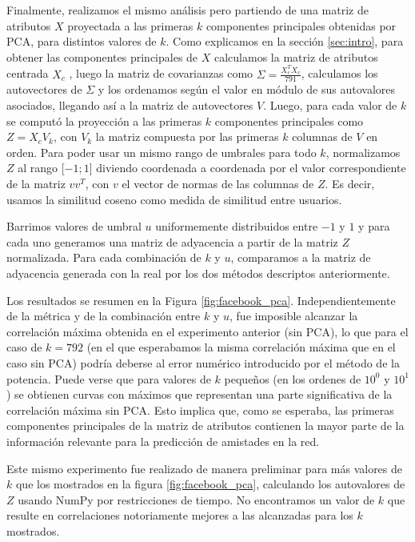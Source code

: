 \documentclass{article}
\begin{document}
Finalmente, realizamos el mismo análisis pero partiendo de una matriz de atributos $X$ proyectada a las primeras $k$ componentes principales obtenidas por PCA, para distintos valores de $k$. Como explicamos en la sección \ref{sec:intro}, para obtener las componentes principales de $X$ calculamos la matriz de atributos centrada $X_c$ 
, luego la matriz de covarianzas como $\Sigma = \frac{X_c^TX_c}{791}$, calculamos los autovectores de $\Sigma$ y los ordenamos según el valor en módulo de sus autovalores asociados, llegando así a la matriz de autovectores $V$. Luego, para cada valor de $k$ se computó la proyección a las primeras $k$ componentes principales como $Z = X_cV_k$, con $V_k$ la matriz compuesta por las primeras $k$ columnas de $V$ en orden. Para poder usar un mismo rango de umbrales para todo $k$, normalizamos $Z$ al rango [$-1; 1$] diviendo coordenada a coordenada por el valor correspondiente de la matriz $vv^T$, con $v$ el vector de normas de las columnas de $Z$. Es decir, usamos la similitud coseno como medida de similitud entre usuarios.

Barrimos valores de umbral $u$ uniformemente distribuidos entre $-1$ y $1$ y para cada uno generamos una matriz de adyacencia a partir de la matriz $Z$ normalizada. Para cada combinación de $k$ y $u$, comparamos a la matriz de adyacencia generada con la real por los dos métodos descriptos anteriormente. 

Los resultados se resumen en la Figura \ref{fig:facebook_pca}. Independientemente de la métrica y de la combinación entre $k$ y $u$, fue imposible alcanzar la correlación máxima obtenida en el experimento anterior (sin PCA), lo que para el caso de $k = 792$ (en el que esperabamos la misma correlación máxima que en el caso sin PCA) podría deberse al error numérico introducido por el método de la potencia. Puede verse que para valores de $k$ pequeños (en los ordenes de $10^0$ y $10^1$) se obtienen curvas con máximos que representan una parte significativa de la correlación máxima sin PCA. Esto implica que, como se esperaba, las primeras componentes principales de la matriz de atributos contienen la mayor parte de la información relevante para la predicción de amistades en la red.

Este mismo experimento fue realizado de manera preliminar para más valores de $k$ que los mostrados en la figura \ref{fig:facebook_pca}, calculando los autovalores de $Z$ usando NumPy por restricciones de tiempo. No encontramos un valor de $k$ que resulte en correlaciones notoriamente mejores a las alcanzadas para los $k$ mostrados.
\end{document}
